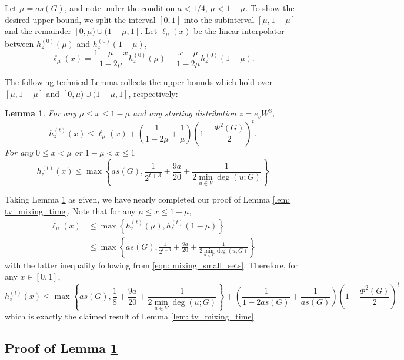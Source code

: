 \documentclass[11pt,twoside]{article}
\newtheorem{lemma}{Lemma}
\newcommand{\set}[1]{\left\{#1\right\}}
\newcommand{\1}{\mathbf{1}}
\begin{document}
Let $\mu = as(G)$, and note under the condition $a < 1/4$, $\mu < 1 - \mu$. To show the desired upper bound, we split the interval $[0,1]$ into the subinterval $[\mu, 1 - \mu]$ and the remainder $[0,\mu) \cup (1 - \mu, 1]$. Let $\ell_{\mu}(x)$ be the linear interpolator between $h_z^{(0)}(\mu)$ and $h_z^{(0)}(1 - \mu)$, 
\begin{equation*}
\ell_{\mu}(x) = \frac{1 - \mu - x}{1 - 2\mu} h_z^{(0)}(\mu) + \frac{x - \mu}{1 - 2\mu}h_z^{(0)}(1 - \mu).
\end{equation*}

The following technical Lemma collects the upper bounds which hold over $[\mu, 1 - \mu]$ and $[0,\mu) \cup (1 - \mu, 1]$, respectively:
\begin{lemma}
	\label{lem: mixing_all_sets}
	For any $\mu \leq x \leq 1 - \mu$ and any starting distribution $z = e_vW^3$,
	\begin{equation}
	\label{eqn: mixing_large_sets}
	h_z^{(t)}(x) \leq \ell_{\mu}(x) + \left(\frac{1}{1 - 2\mu} + \frac{1}{\mu}\right)\left(1 - \frac{\Phi^2(G)}{2}\right)^t.
	\end{equation}
	For any $0 \leq x < \mu$ or $1 - \mu < x \leq 1$
	\begin{equation}
	\label{eqn: mixing_small_sets}
	h_z^{(t)}(x) \leq \max\set{as(G), \frac{1}{2^{t+3}} + \frac{9a}{20} + \frac{1}{2 \min_{u \in V}\deg(u;G)} }
	\end{equation}
\end{lemma}
\noindent Taking Lemma \ref{lem: mixing_all_sets} as given, we have nearly completed our proof of Lemma \ref{lem: tv_mixing_time}. Note that for any $\mu \leq x \leq 1 - \mu$,
\begin{align*}
\ell_{\mu}(x) & \leq \max\set{h_z^{(t)}(\mu),h_z^{(t)}(1 - \mu)} \\
& \leq \max\set{as(G), \frac{1}{2^{t + 3}} + \frac{9a}{20} + \frac{1}{2 \min_{u \in V}\deg(u;G)} }
\end{align*}
with the latter inequality following from \eqref{eqn: mixing_small_sets}. Therefore, for any $x \in [0,1]$,
\begin{equation*}
h_z^{(t)}(x) \leq \max\set{as(G), \frac{1}{8} + \frac{9a}{20} + \frac{1}{2 \min_{u \in V}\deg(u;G)} } + \left(\frac{1}{1 - 2as(G)} + \frac{1}{as(G)}\right)\left(1 - \frac{\Phi^2(G)}{2}\right)^t
\end{equation*}
which is exactly the claimed result of Lemma \ref{lem: tv_mixing_time}.

\subsection{Proof of Lemma \ref{lem: mixing_all_sets}}
\end{document}
